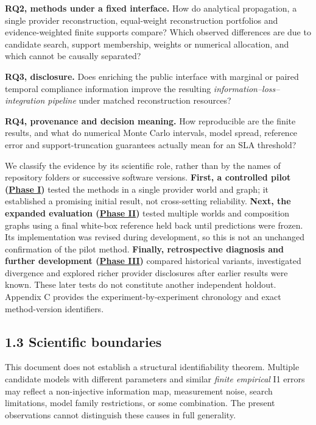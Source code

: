 \documentclass[10pt,a4paper]{article}
\begin{document}
\textbf{RQ2, methods under a fixed interface.} How do analytical propagation, a single provider reconstruction, equal-weight reconstruction portfolios and evidence-weighted finite supports compare? Which observed differences are due to candidate search, support membership, weights or numerical allocation, and which cannot be causally separated?

\textbf{RQ3, disclosure.} Does enriching the public interface with marginal or paired temporal compliance information improve the resulting \emph{information–loss–integration pipeline} under matched reconstruction resources?

\textbf{RQ4, provenance and decision meaning.} How reproducible are the finite results, and what do numerical Monte Carlo intervals, model spread, reference error and support-truncation guarantees actually mean for an SLA threshold?

We classify the evidence by its scientific role, rather than by the names of repository folders or successive software versions. \textbf{First, a controlled pilot (\hyperref[app:experiment-stages]{Phase I})} tested the methods in a single provider world and graph; it established a promising initial result, not cross-setting reliability. \textbf{Next, the expanded evaluation (\hyperref[app:experiment-stages]{Phase II})} tested multiple worlds and composition graphs using a final white-box reference held back until predictions were frozen. Its implementation was revised during development, so this is not an unchanged confirmation of the pilot method. \textbf{Finally, retrospective diagnosis and further development (\hyperref[app:experiment-stages]{Phase III})} compared historical variants, investigated divergence and explored richer provider disclosures after earlier results were known. These later tests do not constitute another independent holdout. Appendix C provides the experiment-by-experiment chronology and exact method-version identifiers.

\subsection*{1.3 Scientific boundaries}

This document does not establish a structural identifiability theorem. Multiple candidate models with different parameters and similar \emph{finite empirical} I1 errors may reflect a non-injective information map, measurement noise, search limitations, model family restrictions, or some combination. The present observations cannot distinguish these causes in full generality.
\end{document}
